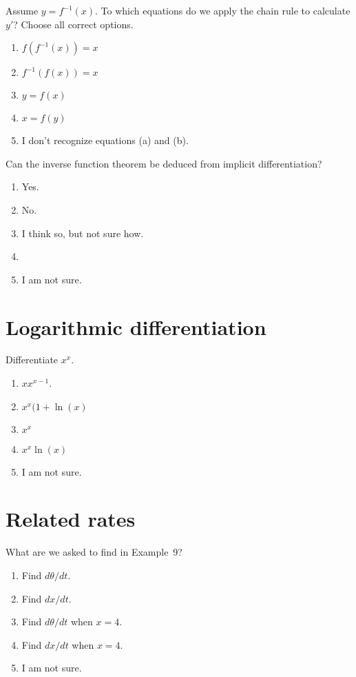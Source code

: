 \documentclass[14pt]{beamer}
\begin{document}
\begin{frame}
  Assume \(y = f^{-1}(x)\). To which equations do we apply the chain rule to calculate \(y'\)? Choose all correct options.

  \medskip
  \begin{enumerate} 
    \item \(f(f^{-1}(x)) = x\)
    \item \(f^{-1}(f(x)) = x\)
    \item \(y = f(x)\)
    \item \(x = f(y)\)
    \item I don't recognize equations (a) and (b).
  \end{enumerate} 
\end{frame}


\begin{frame}
  Can the inverse function theorem be deduced from implicit differentiation?

  \medskip
  \begin{enumerate} 
    \item Yes.
    \item No.
    \item I think so, but not sure how.
    \item 
    \item I am not sure.
  \end{enumerate} 
\end{frame}


\section{Logarithmic differentiation}
\begin{frame}
  Differentiate \(x^{x}\).

  \medskip
  \begin{enumerate} 
    \item \(x x^{x-1}\).
    \item \(x^{x}(1 + \ln(x)\)
    \item \(x^{x}\)
    \item \(x^{x}\ln(x)\)
    \item I am not sure.
  \end{enumerate} 
\end{frame}

\section{Related rates}
\begin{frame}[t]
  What are we asked to find in Example~9?

  \medskip
  \begin{enumerate} 
    \item Find \(d\theta/dt\).
    \item Find \(dx/dt\).
    \item Find \(d\theta/dt\) when \(x = 4\).
    \item Find \(dx/dt\) when \(x = 4\).
    \item I am not sure.
  \end{enumerate} 
\end{frame}
\end{document}
